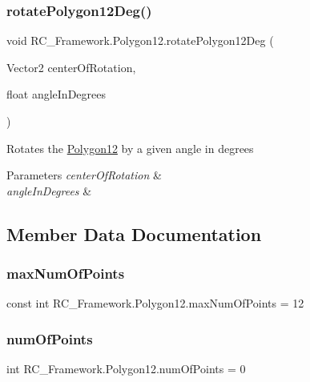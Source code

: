 \subsubsection{\texorpdfstring{rotate\+Polygon12\+Deg()}{rotatePolygon12Deg()}}
{\footnotesize\ttfamily void R\+C\+\_\+\+Framework.\+Polygon12.\+rotate\+Polygon12\+Deg (\begin{DoxyParamCaption}\item[{Vector2}]{center\+Of\+Rotation,  }\item[{float}]{angle\+In\+Degrees }\end{DoxyParamCaption})}



Rotates the \mbox{\hyperlink{class_r_c___framework_1_1_polygon12}{Polygon12}} by a given angle in degrees 


\begin{DoxyParams}{Parameters}
{\em center\+Of\+Rotation} & \\
\hline
{\em angle\+In\+Degrees} & \\
\hline
\end{DoxyParams}


\subsection{Member Data Documentation}
\mbox{\label{class_r_c___framework_1_1_polygon12_a2ad1aadef9d62f58a113524d8d9aa48e}} 
\subsubsection{\texorpdfstring{max\+Num\+Of\+Points}{maxNumOfPoints}}
{\footnotesize\ttfamily const int R\+C\+\_\+\+Framework.\+Polygon12.\+max\+Num\+Of\+Points = 12}

\mbox{\label{class_r_c___framework_1_1_polygon12_abe72eb58151bde5aba872ae5653445b8}} 
\subsubsection{\texorpdfstring{num\+Of\+Points}{numOfPoints}}
{\footnotesize\ttfamily int R\+C\+\_\+\+Framework.\+Polygon12.\+num\+Of\+Points = 0}


